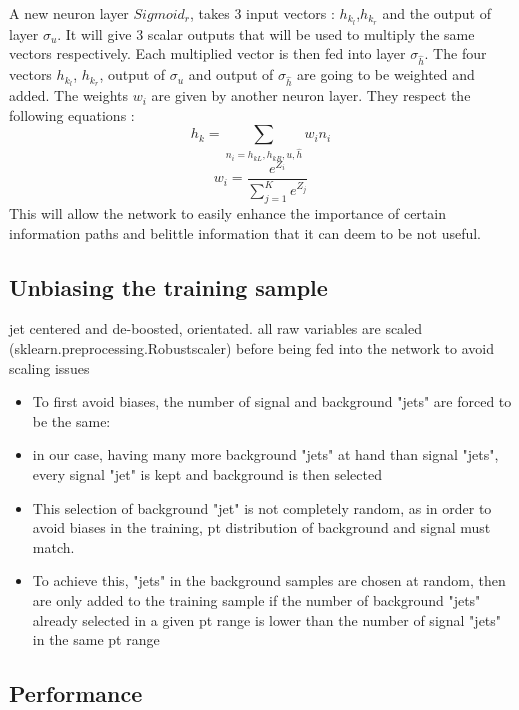 A new neuron layer $Sigmoid_r$, takes 3 input vectors : $h_k_l$,$h_k_r$ and the output of layer $\sigma_u$. It will give 3 scalar outputs that will be used to multiply the same vectors respectively. Each multiplied vector is then fed into layer $\sigma_\hat{h}$. 
The four vectors $h_k_l$, $h_k_r$, output of $\sigma_u$ and output of $\sigma_\hat{h}$ are going to be weighted and added. The weights $w_i$ are given by another neuron layer. They respect the following equations :
\begin{equation}    
    h_{k} = \sum_{n_{i}=h_{kL},h_{kR},u,\hat{h}} w_{i}n_{i}
\end{equation}
\begin{equation}
    w_{i} = \frac{e^{Z_i}}{\sum_{j=1}^{K}e^{Z_j}}
\end{equation}
This will allow the network to easily enhance the importance of certain information paths and belittle information that it can deem to be not useful.

\subsection{Unbiasing the training sample}

jet centered and de-boosted, orientated.
all raw variables are scaled (sklearn.preprocessing.Robustscaler) before being fed into the network to avoid scaling issues

\begin{itemize}
    \item To first avoid biases, the number of signal and background "jets" are forced to be the same:
    \item in our case, having many more background "jets" at hand than signal "jets", every signal "jet" is kept and background is then selected
    \item This selection of background "jet" is not completely random, as in order to avoid biases in the training, pt distribution of background and signal must match.
    \item To achieve this, "jets" in the background samples are chosen at random, then are only added to the training sample if the number of background "jets" already selected in a given pt range is lower than the number of signal "jets" in the same pt range
\end{itemize}

\subsection{Performance}

